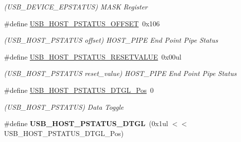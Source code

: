 \begin{DoxyCompactItemize}
\begin{DoxyCompactList}\small\item\em (U\+S\+B\+\_\+\+D\+E\+V\+I\+C\+E\+\_\+\+E\+P\+S\+T\+A\+T\+U\+S) M\+A\+S\+K Register \end{DoxyCompactList}\item 
\hypertarget{group___s_a_m_l21___u_s_b_gaacfa6353d49fe07eb2bd0d2e67cfa3c5}{}\#define \hyperlink{group___s_a_m_l21___u_s_b_gaacfa6353d49fe07eb2bd0d2e67cfa3c5}{U\+S\+B\+\_\+\+H\+O\+S\+T\+\_\+\+P\+S\+T\+A\+T\+U\+S\+\_\+\+O\+F\+F\+S\+E\+T}~0x106\label{group___s_a_m_l21___u_s_b_gaacfa6353d49fe07eb2bd0d2e67cfa3c5}

\begin{DoxyCompactList}\small\item\em (U\+S\+B\+\_\+\+H\+O\+S\+T\+\_\+\+P\+S\+T\+A\+T\+U\+S offset) H\+O\+S\+T\+\_\+\+P\+I\+P\+E End Point Pipe Status \end{DoxyCompactList}\item 
\hypertarget{group___s_a_m_l21___u_s_b_ga75bd95ebf0838b9c469b52801a6d0418}{}\#define \hyperlink{group___s_a_m_l21___u_s_b_ga75bd95ebf0838b9c469b52801a6d0418}{U\+S\+B\+\_\+\+H\+O\+S\+T\+\_\+\+P\+S\+T\+A\+T\+U\+S\+\_\+\+R\+E\+S\+E\+T\+V\+A\+L\+U\+E}~0x00ul\label{group___s_a_m_l21___u_s_b_ga75bd95ebf0838b9c469b52801a6d0418}

\begin{DoxyCompactList}\small\item\em (U\+S\+B\+\_\+\+H\+O\+S\+T\+\_\+\+P\+S\+T\+A\+T\+U\+S reset\+\_\+value) H\+O\+S\+T\+\_\+\+P\+I\+P\+E End Point Pipe Status \end{DoxyCompactList}\item 
\hypertarget{group___s_a_m_l21___u_s_b_ga8eadae650b89d48c3107ffe677762a31}{}\#define \hyperlink{group___s_a_m_l21___u_s_b_ga8eadae650b89d48c3107ffe677762a31}{U\+S\+B\+\_\+\+H\+O\+S\+T\+\_\+\+P\+S\+T\+A\+T\+U\+S\+\_\+\+D\+T\+G\+L\+\_\+\+Pos}~0\label{group___s_a_m_l21___u_s_b_ga8eadae650b89d48c3107ffe677762a31}

\begin{DoxyCompactList}\small\item\em (U\+S\+B\+\_\+\+H\+O\+S\+T\+\_\+\+P\+S\+T\+A\+T\+U\+S) Data Toggle \end{DoxyCompactList}\item 
\hypertarget{group___s_a_m_l21___u_s_b_ga14cb5c3d045e42137ce317a211e33f39}{}\#define {\bfseries U\+S\+B\+\_\+\+H\+O\+S\+T\+\_\+\+P\+S\+T\+A\+T\+U\+S\+\_\+\+D\+T\+G\+L}~(0x1ul $<$$<$ U\+S\+B\+\_\+\+H\+O\+S\+T\+\_\+\+P\+S\+T\+A\+T\+U\+S\+\_\+\+D\+T\+G\+L\+\_\+\+Pos)\label{group___s_a_m_l21___u_s_b_ga14cb5c3d045e42137ce317a211e33f39}


\end{DoxyCompactItemize}
